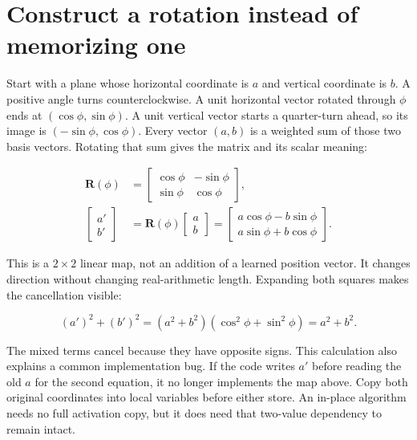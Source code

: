 \section{Construct a rotation instead of memorizing
one}\label{construct-a-rotation-instead-of-memorizing-one}


Start with a plane whose horizontal coordinate is \(a\) and vertical
coordinate is \(b\). A positive angle turns counterclockwise. A unit
horizontal vector rotated through \(\phi\) ends at
\((\cos\phi,\sin\phi)\). A unit vertical vector starts a quarter-turn
ahead, so its image is \((-\sin\phi,\cos\phi)\). Every vector \((a,b)\)
is a weighted sum of those two basis vectors. Rotating that sum gives
the matrix and its scalar meaning:

\begin{equation}
\begin{aligned}
\mathbf{R}(\phi)&=
\begin{bmatrix}\cos\phi&-\sin\phi\\\sin\phi&\cos\phi\end{bmatrix},\\
\begin{bmatrix}a'\\b'\end{bmatrix}
&=\mathbf{R}(\phi)\begin{bmatrix}a\\b\end{bmatrix}
=\begin{bmatrix}a\cos\phi-b\sin\phi\\a\sin\phi+b\cos\phi\end{bmatrix}.
\end{aligned}
\end{equation}

This is a \(2\times2\) linear map, not an addition of a learned position
vector. It changes direction without changing real-arithmetic length.
Expanding both squares makes the cancellation visible:

\begin{equation}
(a')^2+(b')^2
=(a^2+b^2)(\cos^2\phi+\sin^2\phi)=a^2+b^2.
\end{equation}

The mixed terms cancel because they have opposite signs. This
calculation also explains a common implementation bug. If the code
writes \(a'\) before reading the old \(a\) for the second equation, it
no longer implements the map above. Copy both original coordinates into
local variables before either store. An in-place algorithm needs no full
activation copy, but it does need that two-value dependency to remain
intact.

